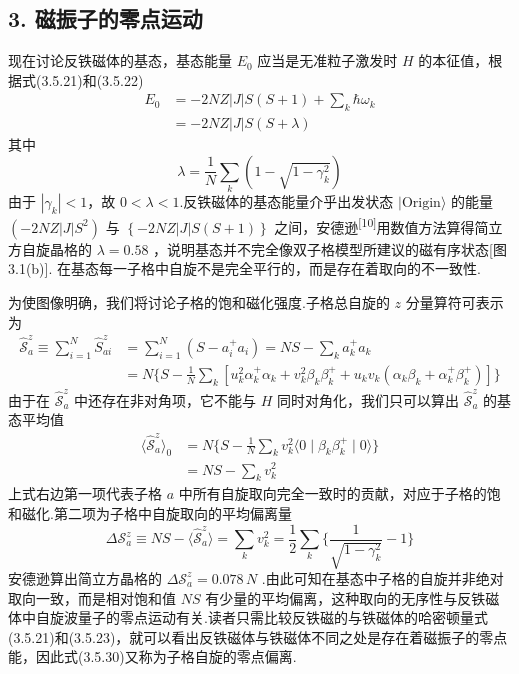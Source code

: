 \subsection*{3. 磁振子的零点运动}

现在讨论反铁磁体的基态，基态能量 $E_0$
应当是无准粒子激发时 $H$ 的本征值，根据式(3.5.21)和(3.5.22)
\begin{equation}
\begin{aligned}
  E_0&=-2NZ\left|J\right|S\left(S+1\right)+\sum_k\hbar\omega_k\\
  &=-2NZ\left|J\right|S\left(S+\lambda\right)
\end{aligned}
\end{equation}
其中
\begin{equation}
  \lambda=\frac{1}{N}\sum_k\left(1-\sqrt{1-\gamma_k^2}\right)
\end{equation}
由于 $\left|\gamma_k\right|<1$，故 $0<\lambda<1$.反铁磁体的基态能量介乎出发状态
$|\mathrm{Origin}\rangle$ 的能量 $\left(-2NZ\left|J\right|S^2\right)$ 与
$\left\{-2NZ\left|J\right|S\left(S+1\right)\right\}$
之间，安德逊\textsuperscript{[10]}用数值方法算得简立方自旋晶格的
$\lambda=0.58$
，说明基态并不完全像双子格模型所建议的磁有序状态[图3.1(b)].
在基态每一子格中自旋不是完全平行的，而是存在着取向的不一致性.

为使图像明确，我们将讨论子格的饱和磁化强度.子格总自旋的 $z$ 分量算符可表示为
\begin{equation*}
\begin{aligned}
  \hat{\mathcal{S}}_a^{z}\equiv\sum_{i=1}^{N}\hat{S}_{ai}^{z}
  &=\sum_{i=1}^{N}\left(S-a_i^{+}a_i\right)=NS-\sum_ka_k^{+}a_k\\
  &=N\biggl\{S-\frac{1}{N}\sum_k\left[u_k^2\alpha_k^{+}\alpha_k
  +v_k^2\beta_k\beta_k^{+}+u_kv_k\left(\alpha_k\beta_k+\alpha_k^{+}\beta_k^{+}\right)\right]\biggr\}
\end{aligned}
\end{equation*}
由于在 $\hat{\mathcal{S}}_a^{z}$ 中还存在非对角项，它不能与 $H$
同时对角化，我们只可以算出 $\hat{\mathcal{S}}_a^{z}$ 的基态平均值
\begin{equation}
\begin{aligned}
  \langle\hat{\mathcal{S}}_a^{z}\rangle_0
  &=N\biggl\{S-\frac{1}{N}\sum_kv_k^2\langle0\mid\beta_k\beta_k^{+}\mid0\rangle\biggr\}\\
  &=NS-\sum_kv_k^2
\end{aligned}
\end{equation}
上式右边第一项代表子格 $a$
中所有自旋取向完全一致时的贡献，对应于子格的饱和磁化.第二项为子格中自旋取向的平均偏离量
\begin{equation}
  \Delta\mathcal{S}_a^{z}\equiv NS-\langle\hat{\mathcal{S}}_a^{z}\rangle=\sum_kv_k^2
  =\frac{1}{2}\sum_k\biggl\{\frac{1}{\sqrt{1-\gamma_k^2}}-1\biggr\}
\end{equation}
安德逊算出简立方晶格的 $\Delta\mathcal{S}_a^{z}=0.078\,N$
.由此可知在基态中子格的自旋并非绝对取向一致，而是相对饱和值 $NS$
有少量的平均偏离，这种取向的无序性与反铁磁体中自旋波量子的零点运动有关.读者只需比较反铁磁的与铁磁体的哈密顿量式(3.5.21)和(3.5.23)，就可以看出反铁磁体与铁磁体不同之处是存在着磁振子的零点能，因此式(3.5.30)又称为子格自旋的零点偏离.

